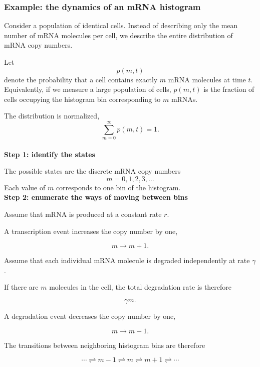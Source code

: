 \subsubsection{Example: the dynamics of an mRNA histogram}

Consider a population of identical cells.
Instead of describing only the mean number of mRNA molecules per cell, we describe the entire distribution of mRNA copy numbers.

Let
\[
    p(m,t)
\]
denote the probability that a cell contains exactly $m$ mRNA molecules at time $t$.
Equivalently, if we measure a large population of cells, $p(m,t)$ is the fraction of cells occupying the histogram bin corresponding to $m$ mRNAs.

The distribution is normalized,
\[
    \sum_{m=0}^{\infty}p(m,t)=1.
\]
\medskip
\\
\textbf{Step 1: identify the states}

The possible states are the discrete mRNA copy numbers
\[
    m=0,1,2,3,\ldots
\]
Each value of $m$ corresponds to one bin of the histogram.
\medskip
\\
\textbf{Step 2: enumerate the ways of moving between bins}

Assume that mRNA is produced at a constant rate $r$.

A transcription event increases the copy number by one,

\[
    m \longrightarrow m+1.
\]

Assume that each individual mRNA molecule is degraded independently at rate $\gamma$.

If there are $m$ molecules in the cell, the total degradation rate is therefore

\[
    \gamma m.
\]

A degradation event decreases the copy number by one,

\[
    m \longrightarrow m-1.
\]

The transitions between neighboring histogram bins are therefore

\[
    \cdots \rightleftharpoons m-1 \rightleftharpoons m \rightleftharpoons m+1 \rightleftharpoons \cdots
\]

